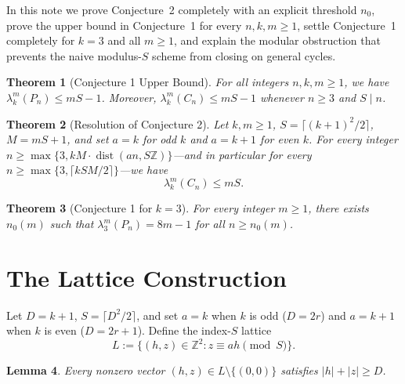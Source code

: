 \documentclass[11pt]{article}
\newtheorem{theorem}{Theorem}
\newtheorem{lemma}[theorem]{Lemma}
\begin{document}
In this note we prove Conjecture~2 completely with an explicit threshold $n_0$, prove the upper bound in Conjecture~1 for every $n, k, m \ge 1$, settle Conjecture~1 completely for $k = 3$ and all $m \ge 1$, and explain the modular obstruction that prevents the naive modulus-$S$ scheme from closing on general cycles.

\begin{theorem}[Conjecture 1 Upper Bound]\label{thm:path}
For all integers $n, k, m \ge 1$, we have $\lambda_k^m(P_n) \le mS - 1$. Moreover, $\lambda_k^m(C_n) \le mS - 1$ whenever $n \ge 3$ and $S \mid n$.
\end{theorem}

\begin{theorem}[Resolution of Conjecture 2]\label{thm:cycle}
Let $k, m \ge 1$, $S = \lceil (k+1)^2/2 \rceil$, $M = mS + 1$, and set $a = k$ for odd $k$ and $a = k + 1$ for even $k$. For every integer $n \ge \max\{3, kM \cdot \operatorname{dist}(an, S\mathbb{Z})\}$—and in particular for every $n \ge \max\{3, \lceil kSM/2 \rceil\}$—we have
\[
\lambda_k^m(C_n) \le mS.
\]
\end{theorem}

\begin{theorem}[Conjecture 1 for $k = 3$]\label{thm:k3}
For every integer $m \ge 1$, there exists $n_0(m)$ such that $\lambda_3^m(P_n) = 8m - 1$ for all $n \ge n_0(m)$.
\end{theorem}

\section{The Lattice Construction}

Let $D = k + 1$, $S = \lceil D^2/2 \rceil$, and set $a = k$ when $k$ is odd ($D = 2r$) and $a = k + 1$ when $k$ is even ($D = 2r + 1$). Define the index-$S$ lattice
\[
L := \{(h, z) \in \mathbb{Z}^2 : z \equiv ah \pmod{S}\}.
\]

\begin{lemma}\label{lem:lattice}
Every nonzero vector $(h, z) \in L \setminus \{(0, 0)\}$ satisfies $|h| + |z| \ge D$.
\end{lemma}
\end{document}
